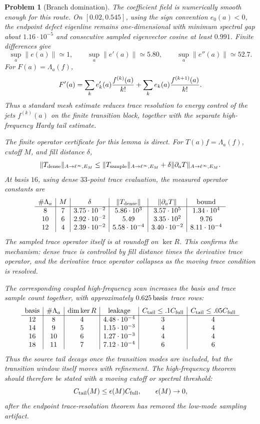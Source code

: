 \documentclass[11pt]{article}
\newtheorem{problem}[theorem]{Problem}
\begin{document}
\begin{problem}[Branch domination]
The coefficient field is numerically smooth enough for this route.  On
\([0.02,0.545]\), using the sign convention \(e_0(a)<0\), the endpoint defect
eigenline remains one-dimensional with minimum spectral gap about
\(1.16\cdot10^{-5}\) and consecutive sampled eigenvector cosine at least
\(0.991\).  Finite differences give
\[
  \sup_a\|e(a)\|\simeq1,\qquad
  \sup_a\|e'(a)\|\simeq5.80,\qquad
  \sup_a\|e''(a)\|\simeq52.7.
\]
For \(F(a)=\Lambda_a(f)\),
\[
  F'(a)=
  \sum_k e_k'(a){f^{(k)}(a)\over k!}
  +\sum_k e_k(a){f^{(k+1)}(a)\over k!}.
\]
Thus a standard mesh estimate reduces trace resolution to energy control of
the jets \(f^{(k)}(a)\) on the finite transition block, together with the
separate high-frequency Hardy tail estimate.

The finite operator certificate for this lemma is direct.  For
\(T(a)f=\Lambda_a(f)\), cutoff \(M\), and fill distance \(\delta\),
\[
  \|T_{\rm dense}\|_{A\to\ell^\infty,E_M}
  \le
  \|T_{\rm sample}\|_{A\to\ell^\infty,E_M}
  +\delta\|\partial_aT\|_{A\to\ell^\infty,E_M}.
\]
At basis \(16\), using dense \(33\)-point trace evaluation, the measured
operator constants are
\[
\begin{array}{c|c|c|c|c|c}
\#\Lambda_a & M & \delta & \|T_{\rm dense}\| &
\|\partial_aT\| & {\rm bound}\\
\hline
8  & 7 & 3.75\cdot10^{-2} & 5.86\cdot10^3 & 3.57\cdot10^5 & 1.34\cdot10^4\\
10 & 6 & 2.92\cdot10^{-2} & 5.49          & 3.35\cdot10^2 & 9.76\\
12 & 4 & 2.39\cdot10^{-2} & 5.58\cdot10^{-4} & 3.40\cdot10^{-2} & 8.11\cdot10^{-4}
\end{array}
\]
The sampled trace operator itself is at roundoff on \(\ker R\).  This confirms
the mechanism: dense trace is controlled by fill distance times the derivative
trace operator, and the derivative trace operator collapses as the moving trace
condition is resolved.

The corresponding coupled high-frequency scan increases the basis and trace
sample count together, with approximately \(0.625\,{\rm basis}\) trace rows:
\[
\begin{array}{c|c|c|c|c|c}
{\rm basis} & \#\Lambda_a & \dim\ker R & {\rm leakage} &
C_{\rm tail}\le .1 C_{\rm full} & C_{\rm tail}\le .05 C_{\rm full}\\
\hline
12 &  8 & 4 & 4.48\cdot10^{-4} & 3 & 4\\
14 &  9 & 5 & 1.15\cdot10^{-3} & 4 & 4\\
16 & 10 & 6 & 1.27\cdot10^{-3} & 4 & 4\\
18 & 11 & 7 & 7.12\cdot10^{-4} & 6 & 6
\end{array}
\]
Thus the source tail decays once the transition modes are included, but the
transition window itself moves with refinement.  The high-frequency theorem
should therefore be stated with a moving cutoff or spectral threshold:
\[
  C_{\rm tail}(M)\le \epsilon(M)C_{\rm full},\qquad \epsilon(M)\to0,
\]
after the endpoint trace-resolution theorem has removed the low-mode sampling
artifact.


\end{problem}
\end{document}
